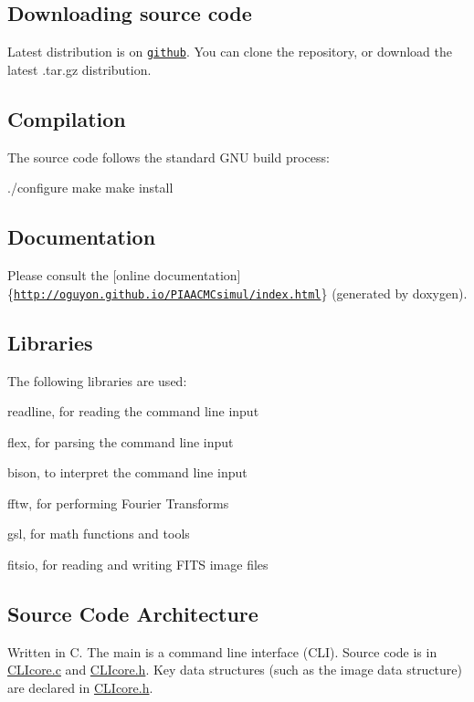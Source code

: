 \subsection*{Downloading source code}

Latest distribution is on \href{https://github.com/oguyon/PIAACMCdesign}{\tt github}. You can clone the repository, or download the latest .tar.\+gz distribution.

\subsection*{Compilation}

The source code follows the standard G\+N\+U build process\+:

./configure make make install

\subsection*{Documentation}

Please consult the \mbox{[}online documentation\mbox{]}\{\href{http://oguyon.github.io/PIAACMCsimul/index.html}{\tt http\+://oguyon.\+github.\+io/\+P\+I\+A\+A\+C\+M\+Csimul/index.\+html}\} (generated by doxygen).

\subsection*{Libraries}

The following libraries are used\+:
\begin{DoxyItemize}
\item readline, for reading the command line input
\item flex, for parsing the command line input
\item bison, to interpret the command line input
\item fftw, for performing Fourier Transforms
\item gsl, for math functions and tools
\item fitsio, for reading and writing F\+I\+T\+S image files
\end{DoxyItemize}

\subsection*{Source Code Architecture}

Written in C. The main is a command line interface (C\+L\+I). Source code is in \hyperlink{CLIcore_8c}{C\+L\+Icore.\+c} and \hyperlink{CLIcore_8h}{C\+L\+Icore.\+h}. Key data structures (such as the image data structure) are declared in \hyperlink{CLIcore_8h}{C\+L\+Icore.\+h}. 